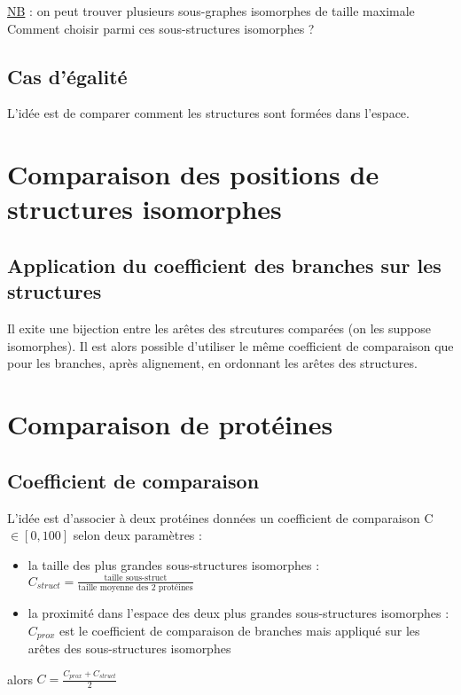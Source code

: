 \documentclass[a4paper, french, twoside]{article}
\begin{document}
\noindent \underline{NB} : on peut trouver plusieurs sous-graphes isomorphes de taille maximale \newline
Comment choisir parmi ces sous-structures isomorphes ?

\subsection{Cas d'égalité}
L'idée est de comparer comment les structures sont formées dans l'espace.

\section{Comparaison des positions de structures isomorphes}
\subsection{Application du coefficient des branches sur les structures}
Il exite une bijection entre les arêtes des strcutures comparées (on les suppose isomorphes).
Il est alors possible d'utiliser le même coefficient de comparaison que pour les branches,
après alignement, en ordonnant les arêtes des structures.

\section{Comparaison de protéines}
\subsection{Coefficient de comparaison}
L'idée est d'associer à deux protéines données un coefficient de comparaison C$\in [0,100]$ selon deux paramètres :
\begin{itemize}
    \item la taille des plus grandes sous-structures isomorphes :
    $C_{struct} = \frac{\text{taille sous-struct}}{\text{taille moyenne des 2 protéines}}$ \newline
    \item la proximité dans l'espace des deux plus grandes sous-structures isomorphes : 
    $C_{prox}$ est le coefficient de comparaison de branches mais appliqué sur les arêtes des sous-structures isomorphes
\end{itemize}
alors $\boxed{C = \displaystyle \frac{C_{prox}+C_{struct}}{2}}$
\end{document}
